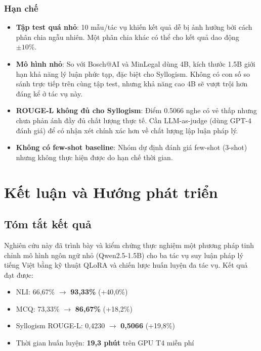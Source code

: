 \documentclass[fontsize=13pt,a4paper,oneside,DIV=calc,chapterprefix=true]{scrbook}
\begin{document}
\subsection{Hạn chế}

\begin{itemize}
  \item \textbf{Tập test quá nhỏ}: 10 mẫu/tác vụ khiến kết quả dễ bị ảnh hưởng bởi cách phân
    chia ngẫu nhiên. Một phân chia khác có thể cho kết quả dao động $\pm 10\%$.
  \item \textbf{Mô hình nhỏ}: So với Bosch@AI và MinLegal dùng 4B, kích thước 1.5B giới hạn
    khả năng lý luận phức tạp, đặc biệt cho Syllogism. Không có con số so sánh trực tiếp
    trên cùng tập test, nhưng khả năng cao 4B sẽ vượt trội hơn đáng kể ở tác vụ này.
  \item \textbf{ROUGE-L không đủ cho Syllogism}: Điểm 0.5066 nghe có vẻ thấp nhưng chưa phản
    ánh đầy đủ chất lượng thực tế. Cần LLM-as-judge (dùng GPT-4 đánh giá) để có nhận xét
    chính xác hơn về chất lượng lập luận pháp lý.
  \item \textbf{Không có few-shot baseline}: Nhóm dự định đánh giá few-shot (3-shot) nhưng
    không thực hiện được do hạn chế thời gian.
\end{itemize}

\chapter*{Kết luận và Hướng phát triển}
\label{chap:conclusion}

\section*{Tóm tắt kết quả}

Nghiên cứu này đã trình bày và kiểm chứng thực nghiệm một phương pháp tinh chỉnh mô hình
ngôn ngữ nhỏ (Qwen2.5-1.5B) cho ba tác vụ suy luận pháp lý tiếng Việt bằng kỹ thuật QLoRA
và chiến lược huấn luyện đa tác vụ. Kết quả đạt được:

\begin{itemize}
  \item NLI: 66,67\% $\to$ \textbf{93,33\%} (+40,0\%)
  \item MCQ: 73,33\% $\to$ \textbf{86,67\%} (+18,2\%)
  \item Syllogism ROUGE-L: 0,4230 $\to$ \textbf{0,5066} (+19,8\%)
  \item Thời gian huấn luyện: \textbf{19,3 phút} trên GPU T4 miễn phí
\end{itemize}
\end{document}
